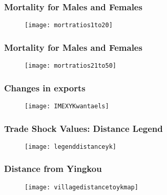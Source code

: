 \begin{frame}[label = morttrends120]
\frametitle{Mortality for Males and Females \hyperlink{data}{}}
\begin{figure}[h!]
\texttt{[image: mortratios1to20]}\\
{\tiny }
\end{figure}
\end{frame}

\begin{frame}[label = morttrends2150]
\frametitle{Mortality for Males and Females}
\begin{figure}[h!]
\texttt{[image: mortratios21to50]}\\
{\tiny }
\end{figure}
\hyperlink{data}{}
\end{frame}



\begin{frame}[label = exports]
\frametitle{Changes in exports \hyperlink{data}{} \hyperlink{otherexportpics}{}}
\begin{figure}[h!]
\texttt{[image: IMEXYKwantaels]}\\
{\tiny }
\end{figure}

\end{frame}



\begin{frame}[label = distancelegend]
\frametitle{Trade Shock Values: Distance Legend \hyperlink{distance}{}  \hyperlink{data}{}} 
\begin{figure}[h!]
\texttt{[image: legenddistanceyk]}\\
{\tiny }
\end{figure}
\end{frame}

\begin{frame}[label = distance]
\frametitle{Distance from Yingkou\\
\hyperlink{distancelegend}{} \hyperlink{data}{}}
\begin{figure}[h!]
\texttt{[image: villagedistancetoykmap]}\\
{\tiny }
\end{figure}
\end{frame}

